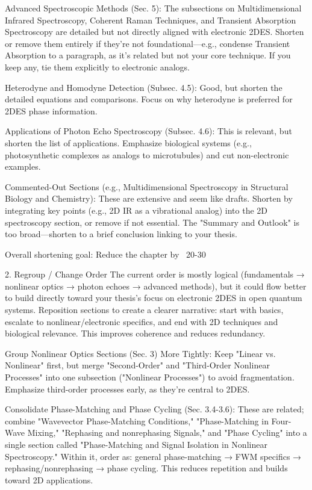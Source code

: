 {Advanced Spectroscopic Methods (Sec. 5): The subsections on Multidimensional Infrared Spectroscopy, Coherent Raman Techniques, and Transient Absorption Spectroscopy are detailed but not directly aligned with electronic 2DES. Shorten or remove them entirely if they're not foundational—e.g., condense Transient Absorption to a paragraph, as it's related but not your core technique. If you keep any, tie them explicitly to electronic analogs.

Heterodyne and Homodyne Detection (Subsec. 4.5): Good, but shorten the detailed equations and comparisons. Focus on why heterodyne is preferred for 2DES phase information.

Applications of Photon Echo Spectroscopy (Subsec. 4.6): This is relevant, but shorten the list of applications. Emphasize biological systems (e.g., photosynthetic complexes as analogs to microtubules) and cut non-electronic examples.

Commented-Out Sections (e.g., Multidimensional Spectroscopy in Structural Biology and Chemistry): These are extensive and seem like drafts. Shorten by integrating key points (e.g., 2D IR as a vibrational analog) into the 2D spectroscopy section, or remove if not essential. The "Summary and Outlook" is too broad—shorten to a brief conclusion linking to your thesis.

Overall shortening goal: Reduce the chapter by ~20-30%

2. Regroup / Change Order
The current order is mostly logical (fundamentals → nonlinear optics → photon echoes → advanced methods), but it could flow better to build directly toward your thesis's focus on electronic 2DES in open quantum systems. Reposition sections to create a clearer narrative: start with basics, escalate to nonlinear/electronic specifics, and end with 2D techniques and biological relevance. This improves coherence and reduces redundancy.

Group Nonlinear Optics Sections (Sec. 3) More Tightly: Keep "Linear vs. Nonlinear" first, but merge "Second-Order" and "Third-Order Nonlinear Processes" into one subsection ("Nonlinear Processes") to avoid fragmentation. Emphasize third-order processes early, as they're central to 2DES.

Consolidate Phase-Matching and Phase Cycling (Sec. 3.4-3.6): These are related; combine "Wavevector Phase-Matching Conditions," "Phase-Matching in Four-Wave Mixing," "Rephasing and nonrephasing Signals," and "Phase Cycling" into a single section called "Phase-Matching and Signal Isolation in Nonlinear Spectroscopy." Within it, order as: general phase-matching → FWM specifics → rephasing/nonrephasing → phase cycling. This reduces repetition and builds toward 2D applications.

}
